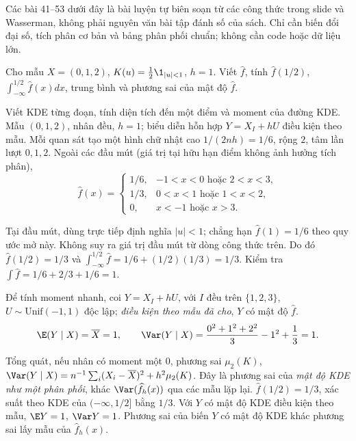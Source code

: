 \noindent Các bài 41--53 dưới đây là bài luyện tự biên soạn từ các công thức trong slide và Wasserman, không phải nguyên văn bài tập đánh số của sách. Chỉ cần biến đổi đại số, tích phân cơ bản và bảng phân phối chuẩn; không cần code hoặc dữ liệu lớn.

\begin{problem}\label{k:41}
Cho mẫu $X=(0,1,2)$, $K(u)=\frac12\1_{|u|<1}$, $h=1$.
Viết $\widehat f$, tính $\widehat f(1/2)$, $\int_{-\infty}^{1/2}\widehat f(x)dx$, trung bình và phương sai của mật độ $\widehat f$.
\end{problem}
\begin{solution}
Viết KDE từng đoạn, tính diện tích đến một điểm và moment của đường KDE.
Mẫu $(0,1,2)$, nhân đều, $h=1$; biểu diễn hỗn hợp $Y=X_I+hU$ điều kiện theo mẫu.
Mỗi quan sát tạo một hình chữ nhật cao $1/(2nh)=1/6$, rộng $2$, tâm lần lượt $0,1,2$. Ngoài các đầu mút (giá trị tại hữu hạn điểm không ảnh hưởng tích phân),
\[
 \widehat f(x)=\begin{cases}
 1/6,&-1<x<0\text{ hoặc }2<x<3,\\
 1/3,&0<x<1\text{ hoặc }1<x<2,\\
 0,&x<-1\text{ hoặc }x>3.
 \end{cases}
\]

Tại đầu mút, dùng trực tiếp định nghĩa $|u|<1$; chẳng hạn $\widehat f(1)=1/6$ theo quy ước mở này. Không suy ra giá trị đầu mút từ dòng công thức trên.
Do đó $\widehat f(1/2)=1/3$ và $\int_{-\infty}^{1/2}\widehat f=1/6+(1/2)(1/3)=1/3$.
Kiểm tra $\int\widehat f=1/6+2/3+1/6=1$.

Để tính moment nhanh, coi $Y=X_I+hU$, với $I$ đều trên $\{1,2,3\}$, $U\sim\mathrm{Unif}(-1,1)$ độc lập; \emph{điều kiện theo mẫu đã cho}, $Y$ có mật độ $\widehat f$.
\[
 \E(Y\mid X)=\overline X=1,\qquad
 \Var(Y\mid X)=\frac{0^2+1^2+2^2}{3}-1^2+\frac13=1.
\]

Tổng quát, nếu nhân có moment một 0, phương sai $\mu_2(K)$,
$\Var(Y\mid X)=n^{-1}\sum_i(X_i-\overline X)^2+h^2\mu_2(K)$.
Đây là phương sai của \emph{mật độ KDE như một phân phối}, khác $\Var(\widehat f_h(x))$ qua các mẫu lặp lại.
$\widehat f(1/2)=1/3$, xác suất theo KDE của $(-\infty,1/2]$ bằng $1/3$. Với $Y$ có mật độ KDE điều kiện theo mẫu, $\E Y=1$, $\Var Y=1$.
Phương sai của biến $Y$ có mật độ KDE khác phương sai lấy mẫu của $\widehat f_h(x)$.
\end{solution}

